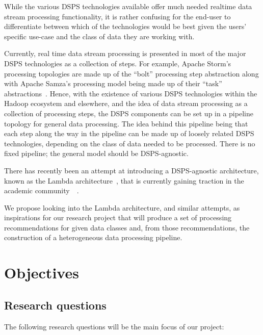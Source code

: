 \documentclass[a4paper,11pt]{article}
\begin{document}
While the various DSPS technologies available offer much needed realtime data stream processing functionality, it is
rather confusing for the end-user to differentiate between which of the technologies would be best given the users'
specific use-case and the class of data they are working with.

Currently, real time data stream processing is presented in most of the major DSPS technologies as a collection of
steps. For example, Apache Storm's processing topologies are made up of the ``bolt'' processing step abstraction along
with Apache Samza's processing model being made up of their ``task'' abstractions~\cite{kamburugamuve_survey_2014}.
Hence, with the existence of various DSPS technologies within the Hadoop ecosystem and elsewhere, and the idea of data
stream processing as a collection of processing steps, the DSPS components can be set up in a pipeline topology for
general data processing. The idea behind this pipeline being that each step along the way in the pipeline can be made up
of loosely related DSPS technologies, depending on the class of data needed to be processed. There is no fixed pipeline;
the general model should be DSPS-agnostic.

There has recently been an attempt at introducing a DSPS-agnostic architecture, known as the Lambda
architecture~\cite{marz2013principles}, that is currently gaining traction in the academic
community~\cite{islam_cloud_2014}~\cite{liu_survey_2014}.

We propose looking into the Lambda architecture, and similar attempts, as inspirations for our research project that
will  produce a set of processing recommendations for given data classes and, from those recommendations, the
construction of a heterogeneous data processing pipeline.




\newpage


\section{Objectives} %
\label{sec:objectives}

\subsection{Research questions} %
\label{sub:research_questions}

The following research questions will be the main focus of our project:
\end{document}

